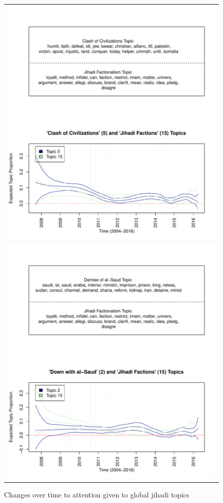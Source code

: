 \begin{figure}
\begin{center}
\caption{Changes over time to attention given to global jihadi topics }
  \label{fig:civsandfactions}
  \begin{tabular}{c}
    \includegraphics[width=.65\columnwidth]{./Pictures/ClashFactions_UT7_K18.pdf}\\
\includegraphics[width=.65\columnwidth]{./Pictures/TransJihadiAlt_UT7_K18.pdf}\\
  \end{tabular} 
\end{center}
  \end{figure}
